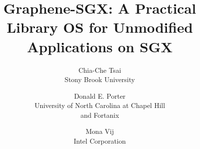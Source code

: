 \documentclass[letterpaper,twocolumn,10pt]{article}
\begin{document}

\def\longconferencenames{}


\title{Graphene-SGX: A Practical Library OS for Unmodified Applications on SGX}

\author{
{\rm Chia-Che Tsai}\\
Stony Brook University
\and
{\rm Donald E. Porter}\\
University of North Carolina at Chapel Hill \\ and Fortanix
\and
{\rm Mona Vij}\\
Intel Corporation
} %

\date{\vspace{-4ex}} %

\newcommand{\subtitle}[1]{%
  \posttitle{%
    \par\end{center}
    \begin{center}\large#1\end{center}
    \vskip0.5em}%
}


\maketitle



\titleformat{\section}[block]{
  \fontsize{12}{15}\bfseries}{%
  \thesection}{%
  1em}{%
  }{%
  }%
  
\end{document}
